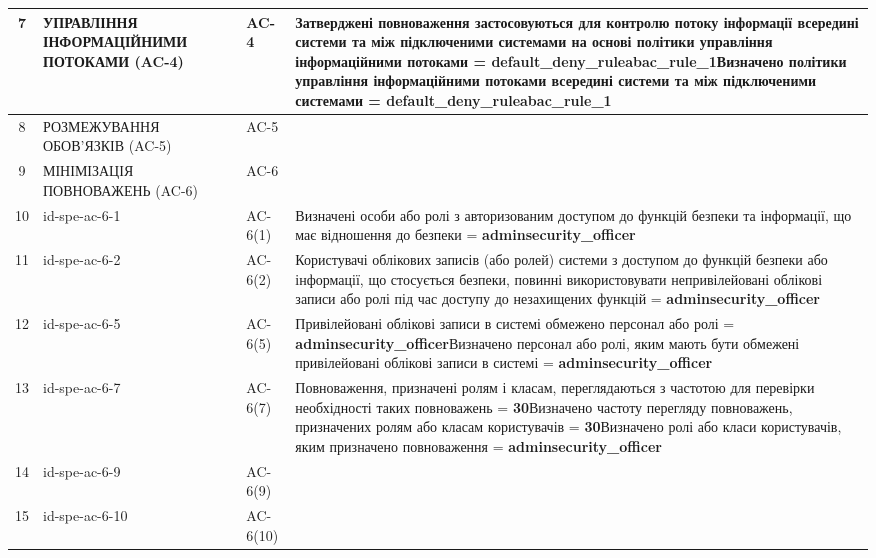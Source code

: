 \documentclass[10pt]{article}
\begin{document}
\begin{longtable}{|c|>{\raggedright\arraybackslash}p{4cm}|>{\raggedright\arraybackslash}p{2.5cm}|>{\raggedright\arraybackslash}p{3.5cm}|>{\raggedright\arraybackslash}p{5.5cm}|}
7 & УПРАВЛІННЯ ІНФОРМАЦІЙНИМИ ПОТОКАМИ (AC-4) &  & AC-4 & Затверджені повноваження застосовуються для контролю потоку інформації всередині системи та між підключеними системами на основі політики управління інформаційними потоками = \textbf{default\_\allowbreak{}deny\_\allowbreak{}ruleabac\_\allowbreak{}rule\_\allowbreak{}1}\newline Визначено політики управління інформаційними потоками всередині системи та між підключеними системами = \textbf{default\_\allowbreak{}deny\_\allowbreak{}ruleabac\_\allowbreak{}rule\_\allowbreak{}1} \\ \hline
8 & РОЗМЕЖУВАННЯ ОБОВ'ЯЗКІВ (AC-5) &  & AC-5 &  \\ \hline
9 & МІНІМІЗАЦІЯ ПОВНОВАЖЕНЬ (AC-6) &  & AC-6 &  \\ \hline
10 & id-spe-ac-6-1 &  & AC-6(1) & Визначені особи або ролі з авторизованим доступом до функцій безпеки та інформації, що має відношення до безпеки = \textbf{adminsecurity\_\allowbreak{}officer} \\ \hline
11 & id-spe-ac-6-2 &  & AC-6(2) & Користувачі облікових записів (або ролей) системи з доступом до функцій безпеки або інформації, що стосується безпеки, повинні використовувати непривілейовані облікові записи або ролі під час доступу до незахищених функцій = \textbf{adminsecurity\_\allowbreak{}officer} \\ \hline
12 & id-spe-ac-6-5 &  & AC-6(5) & Привілейовані облікові записи в системі обмежено персонал або ролі = \textbf{adminsecurity\_\allowbreak{}officer}\newline Визначено персонал або ролі, яким мають бути обмежені привілейовані облікові записи в системі = \textbf{adminsecurity\_\allowbreak{}officer} \\ \hline
13 & id-spe-ac-6-7 &  & AC-6(7) & Повноваження, призначені ролям і класам, переглядаються з частотою для перевірки необхідності таких повноважень = \textbf{30}\newline Визначено частоту перегляду повноважень, призначених ролям або класам користувачів = \textbf{30}\newline Визначено ролі або класи користувачів, яким призначено повноваження  = \textbf{adminsecurity\_\allowbreak{}officer} \\ \hline
14 & id-spe-ac-6-9 &  & AC-6(9) &  \\ \hline
15 & id-spe-ac-6-10 &  & AC-6(10) &  \\ \hline

\end{longtable}
\end{document}
